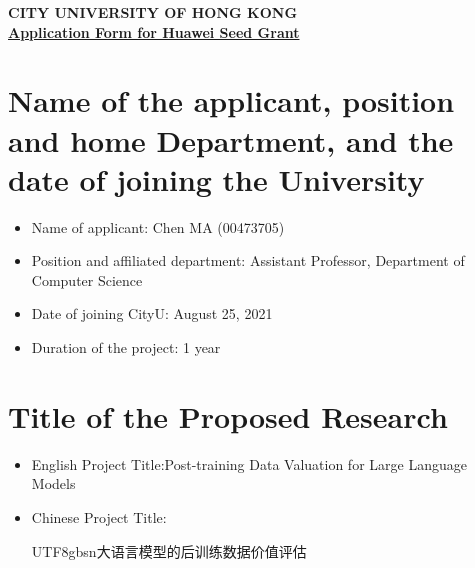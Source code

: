 \documentclass[12pt,a4paper]{article}
\begin{document}
\vspace{-60pt}
\begin{center}
    \textbf{CITY UNIVERSITY OF HONG KONG} \\
    \vspace{10pt}
    \underline{\textbf{Application Form for Huawei Seed Grant}} \\

\end{center}


\section{Name of the applicant, position and home Department, and the date of joining the University}

\begin{itemize}[leftmargin=15pt]
    \vspace{-8pt}
    \item Name of applicant: Chen MA (00473705)
    
    \vspace{-8pt}
    \item Position and affiliated department: Assistant Professor, Department of Computer Science
    
    \vspace{-8pt}
    \item Date of joining CityU: August 25, 2021
    
    \vspace{-8pt}
    \item Duration of the project: 1 year
\end{itemize}


\vspace{-20pt}
\section{Title of the Proposed Research}

\begin{itemize}
    \vspace{-8pt}
    \item English Project Title:Post-training Data Valuation for Large Language Models
    \vspace{-8pt}
    \item Chinese Project Title: \begin{CJK*}{UTF8}{gbsn}大语言模型的后训练数据价值评估\end{CJK*}

\end{itemize}
\end{document}
